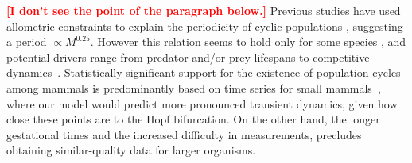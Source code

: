 \documentclass{pnastwo}
\newcommand{\sid}[1]{\textcolor{red}{\bf [#1]}}
\begin{document}
\begin{article}
\sid{I don't see the point of the paragraph below.}
Previous studies have used allometric constraints to explain the periodicity
of cyclic populations
\cite{CalderIII:1983jd,Peterson:1984hj,Krukonis:1991fk}, suggesting a period
$\propto M^{0.25}$.  However this relation seems to hold only for some
species \cite{Hendriks:2012fc}, and potential drivers range from predator
and/or prey lifespans to competitive
dynamics~\cite{Kendall:1999iy,Hogstedt:2005cr}.
Statistically significant support for the existence of population cycles
among mammals is predominantly based on time series for small
mammals~\cite{Kendall:1998hl}, where our model would predict more pronounced transient dynamics, given how close these points are to
the Hopf bifurcation.  On the other hand, the longer gestational times and
the increased difficulty in measurements, precludes obtaining similar-quality
data for larger organisms.
\vspace{6mm}


\end{article}
\end{document}
